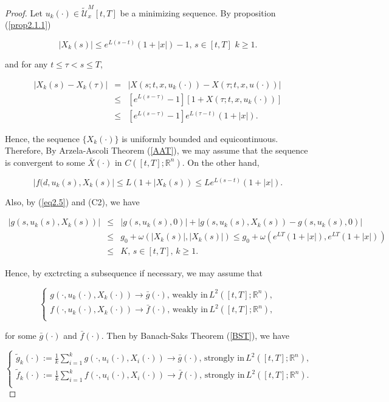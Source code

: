 \begin{proof}
Let $u_k(\cdot)\in\tilde{\mathcal{U}}^M_x[t,T]$ be a minimizing sequence. By proposition (\ref{prop2.1.1})

\begin{equation}\label{eq2.5}
|X_k(s)|\leq e^{L(s-t)}(1+|x|)-1,\,s\in [t,T]\,\,k\geq 1.
\end{equation}

and for any $t\leq \tau<s\leq T$,

\begin{eqnarray*}
|X_k(s)-X_k(\tau)|&=& |X(s;t,x,u_k(\cdot))-X(\tau;t,x,u(\cdot))|\\
&\leq& [e^{L(s-\tau)}-1][1+X(\tau;t,x,u_k(\cdot))]\\
&\leq& [e^{L(s-\tau)}-1]e^{L(\tau-t)}(1+|x|).
\end{eqnarray*}

Hence, the sequence $\{X_k(\cdot)\}$ is uniformly bounded and equicontinuous. Therefore, By Arzela-Ascoli Theorem (\ref{AAT}), we may assume that the sequence is convergent to some $\bar{X}(\cdot)$ in $C([t,T];\mathbb{R}^n)$. On the other hand,

$$|f(d,u_k(s),X_k(s)|\leq L(1+|X_k(s))\leq Le^{L(s-t)}(1+|x|).$$

Also, by (\ref{eq2.5}) and (C2), we have

\begin{eqnarray*}
|g(s,u_k(s),X_k(s))|&\leq& |g(s,u_k(s),0)|+|g(s,u_k(s),X_k(s))-g(s,u_k(s),0)|\\
&\leq& g_0+ \omega(|X_k(s)|,|X_k(s)|)\leq g_0+\omega(e^{LT}(1+|x|),e^{LT}(1+|x|))\\
&\leq& K,\,s\in [t,T],\,k\geq 1.
\end{eqnarray*}

Hence, by exctrcting a subsequence if necessary, we may assume that

$$\left\{ \begin{array}{l}
g(\cdot,u_k(\cdot),X_k(\cdot))\rightarrow \bar{g}(\cdot),\,\mbox{weakly in}\, L^2([t,T];\mathbb{R}^n), \\
f(\cdot,u_k(\cdot),X_k(\cdot))\rightarrow \bar{f}(\cdot),\,\mbox{weakly in}\, L^2([t,T];\mathbb{R}^n),\\
\end{array}
\right.$$

for some $\bar{g}(\cdot)$ and $\bar{f}(\cdot)$. Then by Banach-Saks Theorem (\ref{BST}), we have

\begin{equation}\label{eq2.6}
\left\{ \begin{array}{l}
\tilde{g}_k(\cdot):=\frac{1}{k}\sum_{i=1}^{k}g(\cdot,u_i(\cdot),X_i(\cdot))\rightarrow \bar{g}(\cdot),\,\mbox{strongly in}\, L^2([t,T];\mathbb{R}^n), \\
\tilde{f}_k(\cdot):=\frac{1}{k}\sum_{i=1}^{k}f(\cdot,u_i(\cdot),X_i(\cdot))\rightarrow \bar{f}(\cdot),\,\mbox{strongly in}\, L^2([t,T];\mathbb{R}^n).\\
\end{array}
\right.
\end{equation}


\end{proof}

